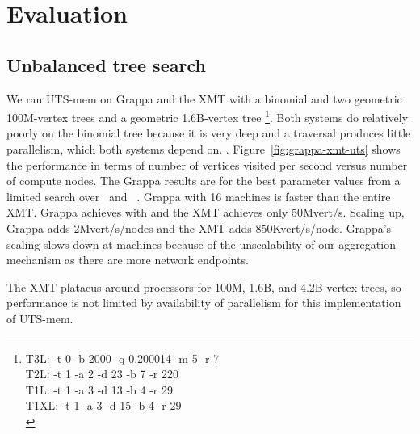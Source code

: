 \section{Evaluation} \label{sec:evaluation}

\subsection{Unbalanced tree search}

We ran UTS-mem on Grappa and the XMT with a binomial and two geometric
100M-vertex trees and a geometric 1.6B-vertex tree
\footnote{T3L: -t 0 -b 2000 -q 0.200014 -m 5 -r 7\\
          T2L: -t 1 -a 2 -d 23 -b 7 -r 220\\
          T1L: -t 1 -a 3 -d 13 -b 4 -r 29\\
          T1XL: -t 1 -a 3 -d 15 -b 4 -r 29\\}.
Both systems do relatively poorly on the binomial tree because it is very deep and a
traversal produces little parallelism, which both systems depend on.
. Figure~\ref{fig:grappa-xmt-uts}
shows the performance in terms of number of vertices visited per
second versus number of compute nodes. The Grappa results are for the
best parameter values from a limited search over \flushtimeout~and
\asyncforthr~.
Grappa with 16 machines is faster than the entire XMT. Grappa achieves
 with  and the
XMT achieves only 50Mvert/s. Scaling up, Grappa adds 2Mvert/s/nodes
and the XMT adds 850Kvert/s/node. Grappa's scaling slows down at
 machines because of the unscalability of our aggregation
mechanism as there are more network endpoints.


The XMT plataeus around  processors for 100M, 1.6B, and
4.2B-vertex trees, so performance is not limited by availability of
parallelism for this implementation of UTS-mem.


